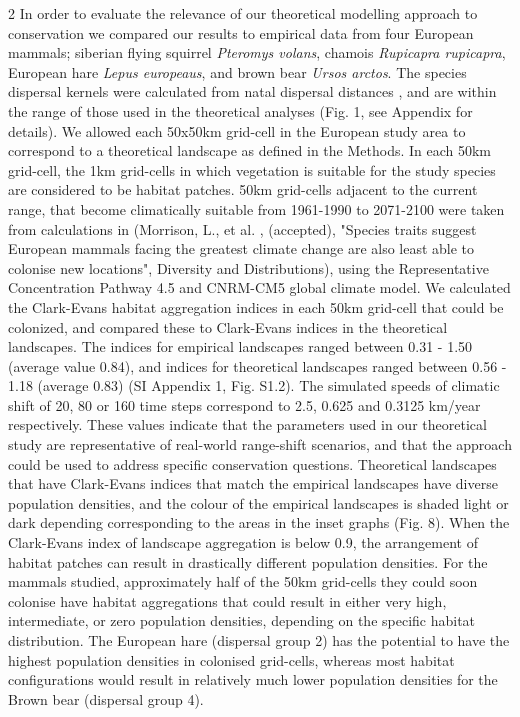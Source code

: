 \documentclass[12pt,pdftex]{article}
\begin{document}
\begin{spacing}{2}
In order to evaluate the relevance of our theoretical modelling approach to conservation we compared our results to empirical data from four European mammals; siberian flying squirrel {\em Pteromys volans}, chamois {\em Rupicapra rupicapra}, European hare {\em Lepus europeaus}, and brown bear {\em Ursos arctos}.  The species dispersal kernels were calculated from natal dispersal distances \citep{Whitmee2013}, and are within the range of those used in the theoretical analyses  (Fig. 1, see Appendix for details).  We allowed each 50x50km grid-cell in the European study area to correspond to a theoretical landscape as defined in the Methods. In each 50km grid-cell, the 1km grid-cells in which vegetation is suitable for the study species are considered to be habitat patches. 50km grid-cells adjacent to the current range, that become climatically suitable from 1961-1990 to 2071-2100 were taken from calculations in (Morrison, L., et al. , (accepted), "Species traits suggest European mammals facing the greatest climate change are also least able to colonise new locations", Diversity and Distributions), using the Representative Concentration Pathway 4.5 and CNRM-CM5 global climate model.  We calculated the Clark-Evans habitat aggregation indices \citep{Clark1954} in each 50km grid-cell that could be colonized, and compared these to Clark-Evans indices in the theoretical landscapes. The indices for empirical landscapes ranged between 0.31 - 1.50 (average value 0.84), and indices for theoretical landscapes ranged between 0.56 - 1.18 (average 0.83) (SI Appendix 1, Fig. S1.2). The simulated speeds of climatic shift of 20, 80 or 160 time steps correspond to 2.5, 0.625 and 0.3125 km/year respectively.  These values indicate that the parameters used in our theoretical study are representative of real-world range-shift scenarios, and that the approach could be used to address specific conservation questions. Theoretical landscapes that have Clark-Evans indices that match the empirical landscapes have diverse population densities, and the colour of the empirical landscapes is shaded light or dark depending corresponding to the areas in the inset graphs (Fig. 8). When the Clark-Evans index of landscape aggregation is below 0.9, the arrangement of habitat patches can result in drastically different population densities.  For the mammals studied, approximately half of the 50km grid-cells they could soon colonise have habitat aggregations that could result in either very high, intermediate, or zero population densities, depending on the specific habitat distribution. The European hare (dispersal group 2) has the potential to have the highest population densities in colonised grid-cells, whereas most habitat configurations would result in relatively much lower population densities for the Brown bear (dispersal group 4). 


\end{spacing}
\end{document}
